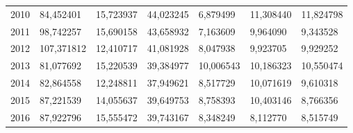 \begin{table}
\begin{tabular}{p{1cm}p{2cm}p{2cm}p{2cm}p{2cm}p{2cm}p{2cm}}
 2010 &       84,452401 &    15,723937 &                                   44,023245 &                           6,879499 &         11,308440 &                           11,824798 \\
 2011 &       98,742257 &    15,690158 &                                   43,658932 &                           7,163609 &          9,964090 &                            9,343528 \\
 2012 &      107,371812 &    12,410717 &                                   41,081928 &                           8,047938 &          9,923705 &                            9,929252 \\
 2013 &       81,077692 &    15,220539 &                                   39,384977 &                          10,006543 &         10,186323 &                           10,550474 \\
 2014 &       82,864558 &    12,248811 &                                   37,949621 &                           8,517729 &         10,071619 &                            9,610318 \\
 2015 &       87,221539 &    14,055637 &                                   39,649753 &                           8,758393 &         10,403146 &                            8,766356 \\
 2016 &       87,922796 &    15,555472 &                                   39,743167 &                           8,348249 &          8,112770 &                            8,515749 \\
\bottomrule
\end{tabular}
\end{table}
